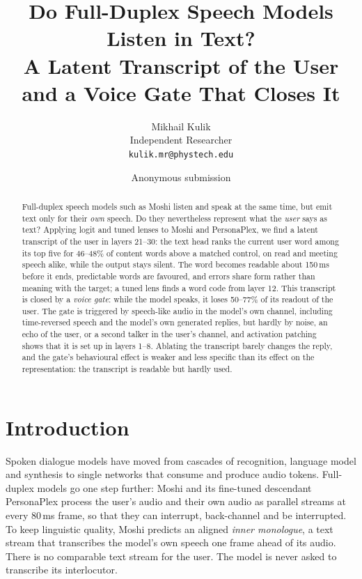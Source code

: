 \documentclass[11pt,a4paper]{article}
\title{Do Full-Duplex Speech Models Listen in Text?\\
A Latent Transcript of the User and a Voice Gate That Closes It}
\author{Mikhail Kulik \\
  Independent Researcher \\
  \texttt{kulik.mr@phystech.edu}}
\author{Anonymous submission}
\newcommand{\PP}{PersonaPlex}
\begin{document}
\maketitle

\begin{abstract}
Full-duplex speech models such as Moshi listen and speak at the same time, but emit text only for their \emph{own} speech.
Do they nevertheless represent what the \emph{user} says as text?
Applying logit and tuned lenses to Moshi and \PP, we find a latent transcript of the user in layers 21--30: the text head ranks the current user word among its top five for 46--48\% of content words above a matched control, on read and meeting speech alike, while the output stays silent.
The word becomes readable about 150\,ms before it ends, predictable words are favoured, and errors share form rather than meaning with the target; a tuned lens finds a word code from layer 12.
This transcript is closed by a \emph{voice gate}: while the model speaks, it loses 50--77\% of its readout of the user.
The gate is triggered by speech-like audio in the model's own channel, including time-reversed speech and the model's own generated replies, but hardly by noise, an echo of the user, or a second talker in the user's channel, and activation patching shows that it is set up in layers 1--8.
Ablating the transcript barely changes the reply, and the gate's behavioural effect is weaker and less specific than its effect on the representation: the transcript is readable but hardly used.
\end{abstract}

\section{Introduction}

Spoken dialogue models have moved from cascades of recognition, language model and synthesis to single networks that consume and produce audio tokens.
Full-duplex models go one step further: Moshi \citep{defossez2024moshi} and its fine-tuned descendant \PP{} \citep{roy2026personaplex} process the user's audio and their own audio as parallel streams at every 80\,ms frame, so that they can interrupt, back-channel and be interrupted.
To keep linguistic quality, Moshi predicts an aligned \emph{inner monologue}, a text stream that transcribes the model's own speech one frame ahead of its audio.
There is no comparable text stream for the user.
The model is never asked to transcribe its interlocutor.
\end{document}
